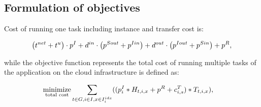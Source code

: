 {    \subsection{Formulation of objectives}
    
    Cost of running one task including instance and transfer cost is:

    \begin{align}
        \left(t^{net} + t^u\right) \cdot p^I + 
        d^{in} \cdot \left(p^{Sout} + p^{Iin}\right) + 
        d^{out} \cdot \left(p^{Iout} + p^{Sin}\right) + 
        p^{R},
    \end{align}

    while the objective function represents the total cost of running multiple
    tasks of the application on the cloud infrastructure is defined as:
    
    \begin{align}    
    \begin{split}
        \underset{\text{total cost}}{\text{minimize}} \sum \limits_{t \in G, i \in I, x \in I^{idx}_i}  ( & 
                    (p^I_i * H_{t,i,x} + p^{R} + c^T_{i,s})*T_{t,i,x} 
                   ),
    \end{split}
    \end{align}
      
}
